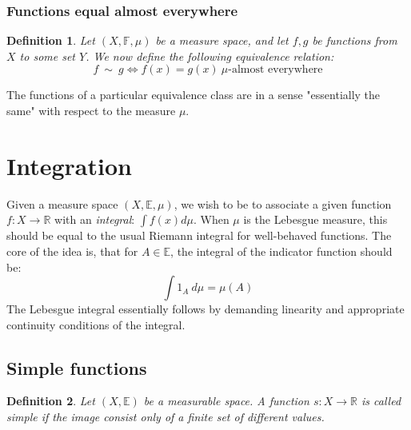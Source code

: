 \documentclass[12pt, a4paper]{article}
\newtheorem{definition}{Definition}[section]
\numberwithin{equation}{section}
\begin{document}
\subsubsection{Functions equal almost everywhere}
\begin{definition}
Let $(X,\mathbb{F},\mu)$ be a measure space, and let $f, g$ be functions from $X$ to some set $Y$. We now define the following equivalence relation:
\begin{equation}
f\ \sim\ g \Leftrightarrow f(x)=g(x)\ \mu\textrm{-almost everywhere}
\end{equation}
\end{definition}

The functions of a particular equivalence class are in a sense "essentially the same" with respect to the measure $\mu$.

\section{Integration}
Given a measure space $(X,\mathbb{E},\mu)$, we wish to be to associate a given function $f: X\rightarrow\mathbb{R}$ with an \textit{integral}: $\int f(x)d\mu$. When $\mu$ is the Lebesgue measure, this should be equal to the usual Riemann integral for well-behaved functions. The core of the idea is, that for $A\in\mathbb{E}$, the integral of the indicator function should be:
\begin{equation}
\label{indicator_integral}
\int 1_A\ d\mu = \mu(A)
\end{equation}
The Lebesgue integral essentially follows by demanding linearity and appropriate continuity conditions of the integral.

\subsection{Simple functions}
\begin{definition}
Let $(X,\mathbb{E})$ be a measurable space. A function $s: X\rightarrow\mathbb{R}$ is called simple if the image consist only of a finite set of different values. 
\end{definition}
\end{document}
